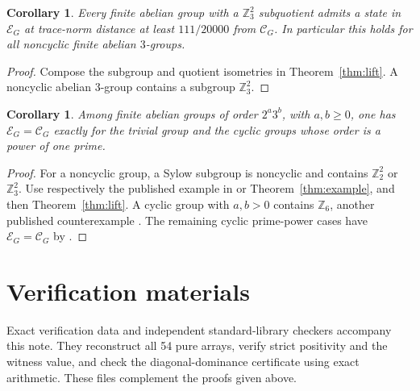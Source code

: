 \documentclass[11pt,a4paper]{article}
\newtheorem{corollary}[theorem]{Corollary}
\theoremstyle{definition}
\theoremstyle{plain}
\newenvironment{statementframe}{%
  \par\addvspace{0.55\baselineskip}\noindent
  \begingroup\setlength{\fboxrule}{0.3pt}\setlength{\fboxsep}{7pt}%
  \begin{lrbox}{\statementbox}%
  \begin{minipage}{\dimexpr\linewidth-2\fboxsep-2\fboxrule\relax}%
}{%
  \end{minipage}\end{lrbox}%
  {\color{black!45}\fbox{\color{black}\usebox{\statementbox}}}%
  \endgroup\par\addvspace{0.45\baselineskip}%
}
\newcommand{\Z}{\mathbb Z}
\newcommand{\E}{\mathcal E}
\newcommand{\hull}{\mathcal C}
\begin{document}
\begin{statementframe}
\begin{corollary}
Every finite abelian group with a $\Z_3^2$ subquotient admits a state in
$\E_G$ at trace-norm distance at least $111/20000$ from $\hull_G$.
In particular this holds for all noncyclic finite abelian $3$-groups.
\end{corollary}
\end{statementframe}
\begin{proof}
Compose the subgroup and quotient isometries in Theorem~\ref{thm:lift}.
A noncyclic abelian $3$-group contains a subgroup $\Z_3^2$.
\end{proof}

\begin{statementframe}
\begin{corollary}
Among finite abelian groups of order $2^a3^b$, with $a,b\geq0$,
one has $\E_G=\hull_G$ exactly for the trivial group and the cyclic groups
whose order is a power of one prime.
\end{corollary}
\end{statementframe}
\begin{proof}
For a noncyclic group, a Sylow subgroup is noncyclic and contains
$\Z_2^2$ or $\Z_3^2$. Use respectively the published example
in \cite{DLR} or Theorem~\ref{thm:example}, and then Theorem~\ref{thm:lift}.
A cyclic group with $a,b>0$ contains $\Z_6$, another published
counterexample \cite{DLR}. The remaining cyclic prime-power cases have
$\E_G=\hull_G$ by \cite{DLR}.
\end{proof}

\section{Verification materials}
Exact verification data and independent standard-library checkers accompany
this note. They reconstruct all 54 pure arrays, verify strict positivity and
the witness value, and check the diagonal-dominance certificate using exact
arithmetic. These files complement the proofs given above.
\end{document}

